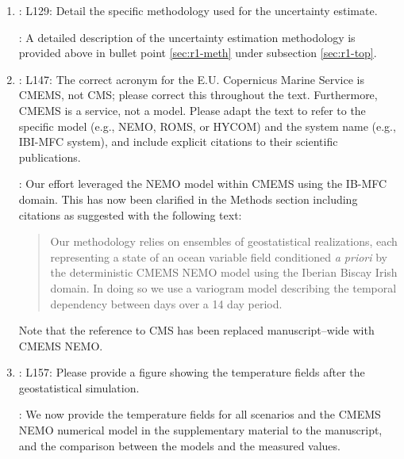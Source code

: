 \documentclass[a4paper]{article}
\begin{document}
\begin{answers}
\begin{enumerate}
\action: This has been clarified with the following text, now at the end
of the Methods section. 


\begin{quote}
  Our end goal is to democratize ocean model prediction, using
  low-cost operations integrated with open-source software to enable
  spatio-temporal data assimilation from mobile or immobile robots
  across space, \ldots
  \end{quote}

\item \reply: L129: Detail the specific methodology used for the
  uncertainty estimate.
  
  \action: A detailed description of the uncertainty estimation
  methodology is provided above in bullet point \ref{sec:r1-meth}
  under subsection \ref{sec:r1-top}.

\item \reply: L147: The correct acronym for the E.U. Copernicus Marine
  Service is CMEMS, not CMS; please correct this throughout the text.
  Furthermore, CMEMS is a service, not a model. Please adapt the text to
  refer to the specific model (e.g., NEMO, ROMS, or HYCOM) and the
  system name (e.g., IBI-MFC system), and include explicit citations to
  their scientific publications.

  \action: Our effort leveraged the NEMO model within CMEMS using the
  IB-MFC domain. This has now been clarified in the Methods section
  including citations as suggested with the following text:

  \begin{quote}

    Our methodology relies on ensembles of geostatistical
    realizations, each representing a state of an ocean variable field
    conditioned \emph{a priori} by the deterministic CMEMS NEMO model
    \cite{madec97,madec15,CMEMS_IBI_MFC} using the Iberian Biscay
    Irish domain. In doing so we use a variogram model describing the
    temporal dependency between days over a 14 day period.

    \end{quote}

    Note that the reference to CMS has been replaced manuscript--wide
    with CMEMS NEMO.

  \item \reply: L157: Please provide a figure showing the temperature
    fields after the geostatistical simulation.
  
    \action: We now provide the temperature fields for all scenarios
    and the CMEMS NEMO numerical model in the supplementary material
    to the manuscript, and the comparison between the models and the
    measured values.


\end{enumerate}
\end{answers}
\end{document}

